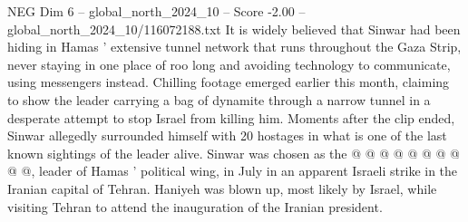 \begin{textsample}{NEG Dim 6 – global\_north\_2024\_10 – Score -2.00 – global\_north\_2024\_10/116072188.txt}
It is widely believed that Sinwar had been hiding in Hamas ' extensive tunnel network that runs throughout the Gaza Strip, never staying in one place of roo long and avoiding technology to communicate, using messengers instead.
Chilling footage emerged earlier this month, claiming to show the leader carrying a bag of dynamite through a narrow tunnel in a desperate attempt to stop Israel from killing him.
Moments after the clip ended, Sinwar allegedly surrounded himself with 20 hostages in what is one of the last known sightings of the leader alive.
Sinwar was chosen as the @ @ @ @ @ @ @ @ @ @, leader of Hamas ' political wing, in July in an apparent Israeli strike in the Iranian capital of Tehran.
Haniyeh was blown up, most likely by Israel, while visiting Tehran to attend the inauguration of the Iranian president.

\end{textsample}

